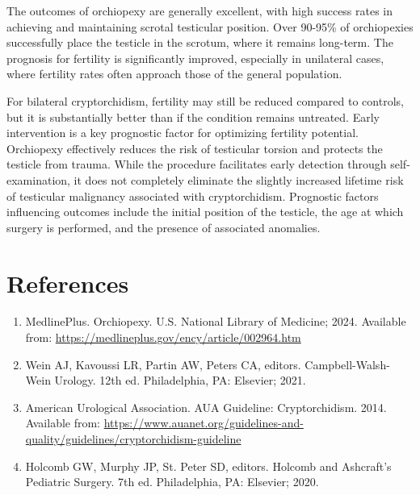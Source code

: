 The outcomes of orchiopexy are generally excellent, with high success rates in achieving and maintaining scrotal testicular position. Over 90-95\% of orchiopexies successfully place the testicle in the scrotum, where it remains long-term. The prognosis for fertility is significantly improved, especially in unilateral cases, where fertility rates often approach those of the general population. 

For bilateral cryptorchidism, fertility may still be reduced compared to controls, but it is substantially better than if the condition remains untreated. Early intervention is a key prognostic factor for optimizing fertility potential. Orchiopexy effectively reduces the risk of testicular torsion and protects the testicle from trauma. While the procedure facilitates early detection through self-examination, it does not completely eliminate the slightly increased lifetime risk of testicular malignancy associated with cryptorchidism. Prognostic factors influencing outcomes include the initial position of the testicle, the age at which surgery is performed, and the presence of associated anomalies.

\section*{References}
\begin{enumerate}
  \item MedlinePlus. Orchiopexy. U.S. National Library of Medicine; 2024. Available from: \url{https://medlineplus.gov/ency/article/002964.htm}
  
  \item Wein AJ, Kavoussi LR, Partin AW, Peters CA, editors. Campbell-Walsh-Wein Urology. 12th ed. Philadelphia, PA: Elsevier; 2021.
  
  \item American Urological Association. AUA Guideline: Cryptorchidism. 2014. Available from: \url{https://www.auanet.org/guidelines-and-quality/guidelines/cryptorchidism-guideline}
  
  \item Holcomb GW, Murphy JP, St. Peter SD, editors. Holcomb and Ashcraft's Pediatric Surgery. 7th ed. Philadelphia, PA: Elsevier; 2020.
\end{enumerate}

\clearpage
